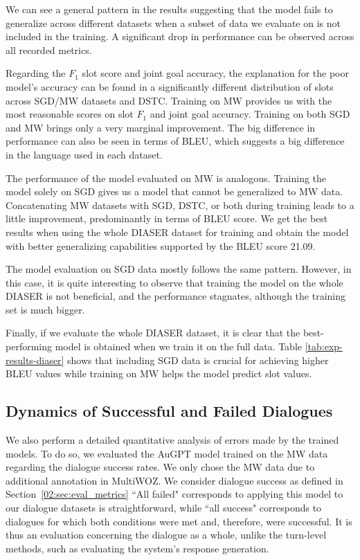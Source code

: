 We can see a general pattern in the results suggesting that the model fails to generalize across different datasets when a subset of data we evaluate on is not included in the training. A significant drop in performance can be observed across all recorded metrics.

Regarding the $F_1$ slot score and joint goal accuracy, the explanation for the poor model's accuracy can be found in a significantly different distribution of slots across SGD/MW datasets and DSTC.
Training on MW provides us with the most reasonable scores on slot $F_1$ and joint goal accuracy.
Training on both SGD and MW brings only a very marginal improvement.
The big difference in performance can also be seen in terms of BLEU, which suggests a big difference in the language used in each dataset.

The performance of the model evaluated on MW is analogous.
Training the model solely on SGD gives us a model that cannot be generalized to MW data.
Concatenating MW datasets with SGD, DSTC, or both during training leads to a little improvement, predominantly in terms of BLEU score.
We get the best results when using the whole DIASER dataset for training and obtain the model with better generalizing capabilities supported by the BLEU score 21.09.

The model evaluation on SGD data mostly follows the same pattern. However, in this case, it is quite interesting to observe that training the model on the whole DIASER is not beneficial, and the performance stagnates, although the training set is much bigger.

Finally, if we evaluate the whole DIASER dataset, it is clear that the best-performing model is obtained when we train it on the full data.
Table \ref{tab:exp-results-diaser} shows that including SGD data is crucial for achieving higher BLEU values while training on MW helps the model predict slot values.

\subsection{Dynamics of Successful and Failed Dialogues}
We also perform a detailed quantitative analysis of errors made by the trained models.
To do so, we evaluated the AuGPT model trained on the MW data regarding the dialogue success rates.
We only chose the MW data due to additional annotation in MultiWOZ.
We consider dialogue success as defined in Section~\ref{02:sec:eval_metrics}
``All failed" corresponds to applying this model to our dialogue datasets is straightforward, while ``all success" corresponds to dialogues for which both conditions were met and, therefore, were successful.
It is thus an evaluation concerning the dialogue as a whole, unlike the turn-level methods, such as evaluating the system's response generation.

